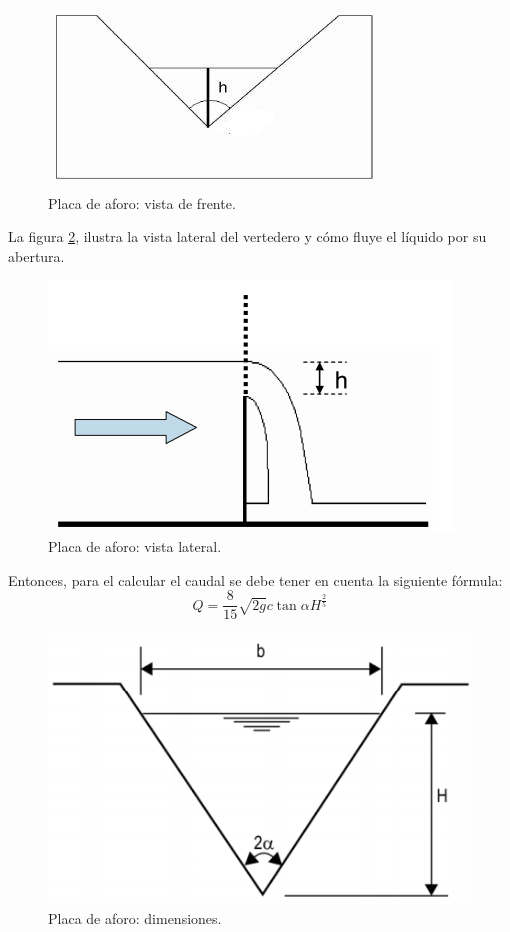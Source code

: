 \begin{figure}[htpb]
\centering
\includegraphics[scale=.75]{./Figures/PlacaDeAforo.jpeg}
\caption{Placa de aforo: vista de frente.}
\label{fig:Placa de aforo}
\end{figure}

\vspace{1cm}
La figura \ref{fig:Placa de aforo-VistaLateral}, ilustra la vista lateral del vertedero y cómo fluye el líquido por su abertura.

\begin{figure}[htpb]
\centering
\includegraphics[scale=.75]{./Figures/PlacaDeAforo-VistaLateral.png}
\caption{Placa de aforo: vista lateral.}
\label{fig:Placa de aforo-VistaLateral}
\end{figure}

Entonces, para el calcular el caudal se debe tener en cuenta la siguiente fórmula:
\begin{equation}
 \label{eq:caudal}
 Q = \frac{8}{15}\sqrt{2g} c \tan\alpha  H^\frac{2}{5} 
\end{equation}
	
\begin{figure}[htpb]
\centering
\includegraphics[scale=.75]{./Figures/DimensionesPlacaAforo.png}
\caption{Placa de aforo: dimensiones.}
\label{fig:Placa de aforo dimensiones}
\end{figure}	

